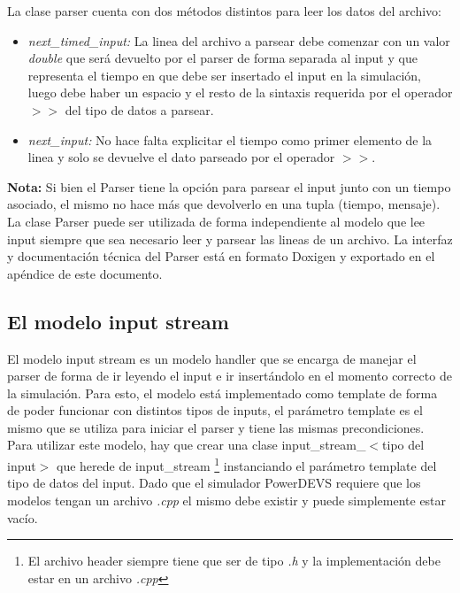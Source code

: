 \documentclass[10pt,a4paper]{article}
\begin{document}
La clase parser cuenta con dos métodos distintos para leer los datos del archivo:
\begin{itemize}
\item \textit{next\_timed\_input:} La linea del archivo a parsear debe comenzar con un valor \textit{double} que será devuelto por el parser de forma separada al input y que representa el tiempo en que debe ser insertado el input en la simulación, luego debe haber un espacio y el resto de la sintaxis requerida por el operador $>>$ del tipo de datos a parsear. 
\item \textit{next\_input:} No hace falta explicitar el tiempo como primer elemento de la linea y solo se devuelve el dato parseado por el operador $>>$.
\end{itemize}

\textbf{Nota:} Si bien el Parser tiene la opción para parsear el input junto con un tiempo asociado, el mismo no hace más que devolverlo en una tupla (tiempo, mensaje).\\

La clase Parser puede ser utilizada de forma independiente al modelo que lee input siempre que sea necesario leer y parsear las lineas de un archivo. La interfaz y documentación técnica del Parser está en formato Doxigen y exportado en el apéndice de este documento.

\newpage

\subsection{El modelo input stream}

El modelo input stream es un modelo handler que se encarga de manejar el parser de forma de ir leyendo el input e ir insertándolo en el momento correcto de la simulación. Para esto, el modelo está implementado como template de forma de poder funcionar con distintos tipos de inputs, el parámetro template es el mismo que se utiliza para iniciar el parser y tiene las mismas precondiciones. \\

Para utilizar este modelo, hay que crear una clase input\_stream\_$<$tipo del input$>$ que herede de input\_stream \footnote{El archivo header siempre tiene que ser de tipo \textit{.h} y la implementación debe estar en un archivo \textit{.cpp}} instanciando el parámetro template del tipo de datos del input. Dado que el simulador PowerDEVS requiere que los modelos tengan un archivo \textit{.cpp} el mismo debe existir y puede simplemente estar vacío. \\
\end{document}
